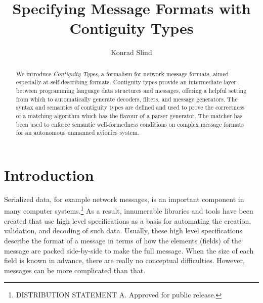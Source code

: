 \documentclass[a4paper,UKenglish,cleveref, autoref, thm-restate]{lipics-v2021}
\title{Specifying Message Formats with Contiguity Types} %
\author{Konrad Slind}{Trusted Systems Group, Collins Aerospace, USA}{konrad.slind@collins.com}{}{}
\begin{document}
\maketitle



\begin{abstract}
We introduce \emph{Contiguity Types}, a formalism for network message
formats, aimed especially at self-describing formats. Contiguity types
provide an intermediate layer between programming language data
structures and messages, offering a helpful setting from which to
automatically generate decoders, filters, and message generators.  The
syntax and semantics of contiguity types are defined and used to prove
the correctness of a matching algorithm which has the flavour of a
parser generator. The matcher has been used to enforce semantic
well-formedness conditions on complex message formats for an
autonomous unmanned avionics system.
\end{abstract}


\section{Introduction}\label{sec:intro}

Serialized data, for example network messages, is an important
component in many computer systems.\footnote{DISTRIBUTION STATEMENT
  A. Approved for public release.}  As a result, innumerable libraries
and tools have been created that use high level specifications as a
basis for automating the creation, validation, and decoding of such
data. Usually, these high level specifications describe the format of
a message in terms of how the elements (fields) of the message are
packed side-by-side to make the full message. When the size of each
field is known in advance, there are really no conceptual
difficulties. However, messages can be more complicated than that.
\end{document}
